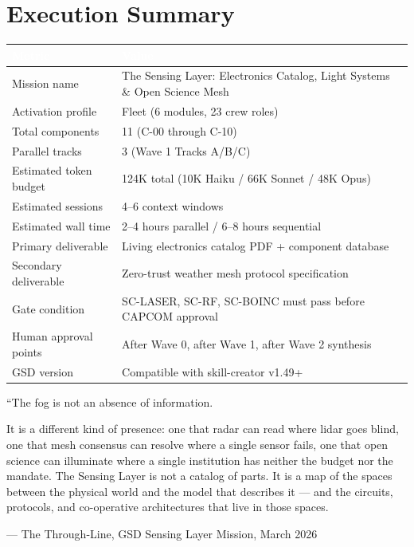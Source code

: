 \documentclass[11pt,letterpaper]{article}
\newcommand{\tableheader}[1]{\textbf{\sffamily\textcolor{white}{#1}}}
\begin{document}
\section{Execution Summary}

\begin{center}
\begin{tabularx}{\textwidth}{L{5cm}X}
\toprule
{}
\tableheader{Metric} & \tableheader{Value} \\
\midrule
Mission name & The Sensing Layer: Electronics Catalog, Light Systems \& Open Science Mesh \\
Activation profile & Fleet (6 modules, 23 crew roles) \\
Total components & 11 (C-00 through C-10) \\
Parallel tracks & 3 (Wave 1 Tracks A/B/C) \\
Estimated token budget & 124K total (10K Haiku / 66K Sonnet / 48K Opus) \\
Estimated sessions & 4--6 context windows \\
Estimated wall time & 2--4 hours parallel / 6--8 hours sequential \\
Primary deliverable & Living electronics catalog PDF + component database \\
Secondary deliverable & Zero-trust weather mesh protocol specification \\
Gate condition & SC-LASER, SC-RF, SC-BOINC must pass before CAPCOM approval \\
Human approval points & After Wave 0, after Wave 1, after Wave 2 synthesis \\
GSD version & Compatible with skill-creator v1.49+ \\
\bottomrule
\end{tabularx}
\end{center}

\vspace{2em}

\begin{quotebox}
{\large\sffamily\textcolor{primary}{``The fog is not an absence of information.}}

{\normalsize\sffamily It is a different kind of presence: one that radar can read where lidar goes blind, one that mesh consensus can resolve where a single sensor fails, one that open science can illuminate where a single institution has neither the budget nor the mandate. The Sensing Layer is not a catalog of parts. It is a map of the spaces between the physical world and the model that describes it --- and the circuits, protocols, and co-operative architectures that live in those spaces.}

{\small\sffamily\textcolor{subtlegray}{--- The Through-Line, GSD Sensing Layer Mission, March 2026}}
\end{quotebox}
\end{document}
